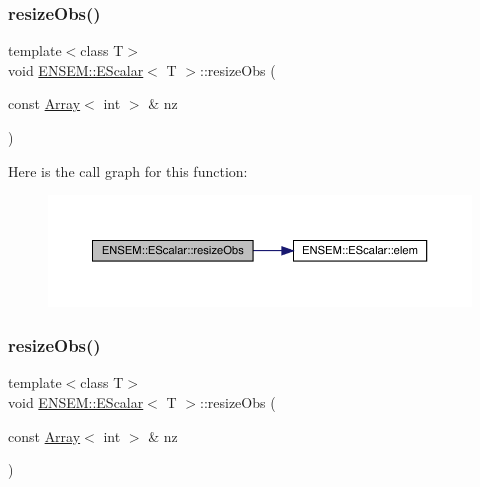 \subsubsection{\texorpdfstring{resizeObs()}{resizeObs()}\hspace{0.1cm}{\footnotesize\ttfamily [11/12]}}
{\footnotesize\ttfamily template$<$class T$>$ \\
void \mbox{\hyperlink{classENSEM_1_1EScalar}{E\+N\+S\+E\+M\+::\+E\+Scalar}}$<$ T $>$\+::resize\+Obs (\begin{DoxyParamCaption}\item[{const \mbox{\hyperlink{classXMLArray_1_1Array}{Array}}$<$ int $>$ \&}]{nz }\end{DoxyParamCaption})\hspace{0.3cm}{\ttfamily [inline]}}

Here is the call graph for this function\+:
\nopagebreak
\begin{figure}[H]
\begin{center}
\leavevmode
\includegraphics[width=350pt]{d0/d82/classENSEM_1_1EScalar_a9273a529024099effecf6962eafa044e_cgraph}
\end{center}
\end{figure}
\mbox{\label{classENSEM_1_1EScalar_a9273a529024099effecf6962eafa044e}} 
\subsubsection{\texorpdfstring{resizeObs()}{resizeObs()}\hspace{0.1cm}{\footnotesize\ttfamily [12/12]}}
{\footnotesize\ttfamily template$<$class T$>$ \\
void \mbox{\hyperlink{classENSEM_1_1EScalar}{E\+N\+S\+E\+M\+::\+E\+Scalar}}$<$ T $>$\+::resize\+Obs (\begin{DoxyParamCaption}\item[{const \mbox{\hyperlink{classXMLArray_1_1Array}{Array}}$<$ int $>$ \&}]{nz }\end{DoxyParamCaption})\hspace{0.3cm}{\ttfamily [inline]}}

